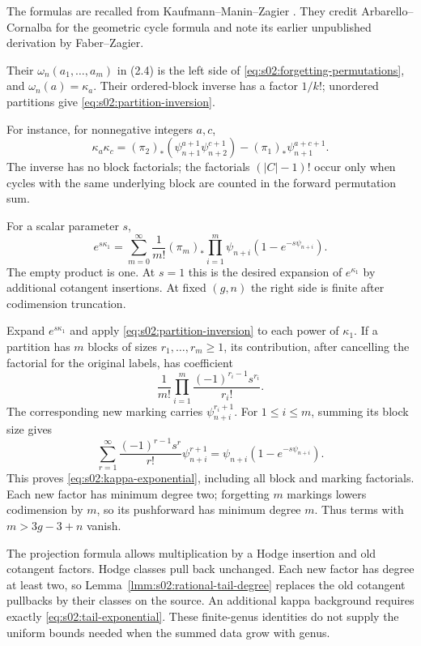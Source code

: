 \begin{rmk}
\label{rmk:s02:forgetting-source}
The formulas are recalled from Kaufmann--Manin--Zagier
\cite[Theorem 2.2, (2.6), and Lemma 2.2.1, (2.8)]{KMZ96v1}.
They credit Arbarello--Cornalba for the geometric cycle formula and
note its earlier unpublished derivation by Faber--Zagier.

Their $\omega_n(a_1,\ldots,a_m)$ in (2.4) is the left side of
\eqref{eq:s02:forgetting-permutations}, and $\omega_n(a)=\kappa_a$.
Their ordered-block inverse has a factor $1/k!$; unordered partitions
give \eqref{eq:s02:partition-inversion}.
\end{rmk}

For instance, for nonnegative integers $a,c$,
\begin{equation}
\label{eq:s02:two-kappas}
\kappa_a\kappa_c
=(\pi_2)_*(\psi_{n+1}^{a+1}\psi_{n+2}^{c+1})
-(\pi_1)_*\psi_{n+1}^{a+c+1}.
\end{equation}
The inverse has no block factorials; the factorials $(|C|-1)!$ occur
only when cycles with the same underlying block are counted in the
forward permutation sum.

\begin{crl}
\label{crl:s02:kappa-exponential}
For a scalar parameter $s$,
\begin{equation}
\label{eq:s02:kappa-exponential}
e^{s\kappa_1}
=\sum_{m=0}^{\infty}\frac{1}{m!}(\pi_m)_*
\prod_{i=1}^m\psi_{n+i}(1-e^{-s\psi_{n+i}}).
\end{equation}
The empty product is one.  At $s=1$ this is the desired expansion of
$e^{\kappa_1}$ by additional cotangent insertions.  At fixed $(g,n)$
the right side is finite after codimension truncation.
\end{crl}

\begin{prf}
Expand $e^{s\kappa_1}$ and apply
\eqref{eq:s02:partition-inversion} to each power of $\kappa_1$.
If a partition has $m$ blocks of sizes $r_1,\ldots,r_m\geq1$, its
contribution, after cancelling the factorial for the original labels,
has coefficient
\[
\frac{1}{m!}\prod_{i=1}^m
\frac{(-1)^{r_i-1}s^{r_i}}{r_i!}.
\]
The corresponding new marking carries $\psi_{n+i}^{r_i+1}$.
For $1\leq i\leq m$, summing its block size gives
\[
\sum_{r=1}^{\infty}\frac{(-1)^{r-1}s^r}{r!}\psi_{n+i}^{r+1}
=\psi_{n+i}(1-e^{-s\psi_{n+i}}).
\]
This proves \eqref{eq:s02:kappa-exponential}, including all block
and marking factorials.  Each new factor has minimum degree two;
forgetting $m$ markings lowers codimension by $m$, so its pushforward
has minimum degree $m$.  Thus terms with $m>3g-3+n$ vanish.
\end{prf}

The projection formula allows multiplication by a Hodge insertion and
old cotangent factors.  Hodge classes pull back unchanged.  Each new
factor has degree at least two, so
Lemma~\ref{lmm:s02:rational-tail-degree} replaces the old cotangent
pullbacks by their classes on the source.  An additional kappa
background requires exactly \eqref{eq:s02:tail-exponential}.
These finite-genus identities do not supply the uniform bounds needed
when the summed data grow with genus.
